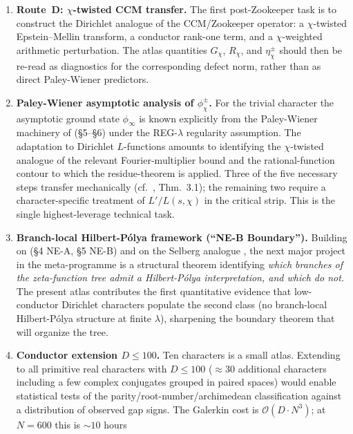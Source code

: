 \documentclass[a4paper,10pt,twocolumn]{article}
\theoremstyle{definition}
\theoremstyle{remark}
\newcommand{\chifn}{\chi}
\begin{document}
\begin{enumerate}
  \item \textbf{Route~D: $\chifn$-twisted CCM transfer.}
    The first post-Zookeeper task is to construct the Dirichlet
    analogue of the CCM/Zookeeper operator: a $\chifn$-twisted
    Epstein--Mellin transform, a conductor rank-one term, and a
    $\chifn$-weighted arithmetic perturbation. The atlas quantities
    $G_{\chifn}$, $R_{\chifn}$, and $\eta^\pm_{\chifn}$ should then
    be re-read as diagnostics for the corresponding defect norm,
    rather than as direct Paley-Wiener predictors.
  \item \textbf{Paley-Wiener asymptotic analysis of
    $\phi^\pm_{\chifn}$.}
    For the trivial character the asymptotic ground state
    $\phi_\infty$ is known explicitly from the Paley-Wiener
    machinery of \cite{RH_II} (\S5--\S6) under the
    REG-$\lambda$ regularity assumption. The adaptation to
    Dirichlet $L$-functions amounts to identifying the
    $\chifn$-twisted analogue of the relevant Fourier-multiplier
    bound and the rational-function contour to which the
    residue-theorem is applied. Three of the five necessary steps
    transfer mechanically (cf.\ \cite{AnalyticGroundstate},
    Thm.~3.1); the remaining two require a character-specific
    treatment of $L'/L(s,\chifn)$ in the critical strip. This is
    the single highest-leverage technical task.
  \item \textbf{Branch-local Hilbert-P\'olya framework (``NE-B
    Boundary'').}
    Building on \cite{RH_II} (\S4 NE-A, \S5 NE-B) and on the
    Selberg analogue \cite{Selberg1956}, the next major project in the meta-programme
    is a structural theorem identifying \emph{which branches of
    the zeta-function tree admit a Hilbert-P\'olya interpretation,
    and which do not.} The present atlas contributes the first
    quantitative evidence that low-conductor Dirichlet characters
    populate the second class (no branch-local Hilbert-P\'olya
    structure at finite $\lambda$), sharpening the boundary
    theorem that will organize the tree.
  \item \textbf{Conductor extension $D\leq 100$.}
    Ten characters is a small atlas. Extending to all primitive
    real characters with $D\leq 100$ ($\approx 30$ additional
    characters including a few complex conjugates grouped in
    paired spaces) would enable statistical tests of the
    parity/root-number/archimedean classification against a
    distribution of observed gap signs. The Galerkin cost is
    $\mathcal{O}(D\cdot N^3)$; at $N=600$ this is $\sim 10$ hours

\end{enumerate}
\end{document}

